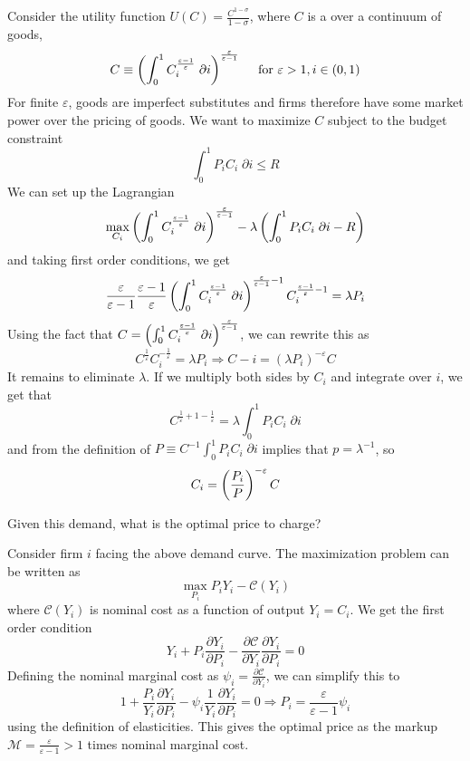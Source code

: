\documentclass[10pt]{article}
\begin{document}
\begin{model}
	 Consider the utility function $U(C) = \frac{C^{1-\sigma}}{1-\sigma}$, where $C$ is a  over a continuum of goods,\[C \equiv \left( \int_0^1 C_i^{\frac{\varepsilon-1}{\varepsilon}}\; \partial i \right)^{\frac{\varepsilon}{\varepsilon-1}} \quad \text{ for } \varepsilon > 1, i \in (0,1)\]For finite $\varepsilon$, goods are imperfect substitutes and firms therefore have some market power over the pricing of goods. We want to maximize $C$ subject to the budget constraint\[\int_0^1 P_i C_i\; \partial i \le R\]We can set up the Lagrangian\[ \max_{C_i} \left( \int_0^1 C_i^{\frac{\varepsilon-1}{\varepsilon}}\;\partial i\right)^{\frac{\varepsilon}{\varepsilon-1}} - \lambda \left( \int_0^1 P_iC_i \;\partial i - R\right)\]and taking first order conditions, we get\[\frac{\varepsilon}{\varepsilon-1} \frac{\varepsilon-1}{\varepsilon} \left( \int_0^1 C_i^{\frac{\varepsilon-1}{\varepsilon}}\;\partial i\right)^{\frac{\varepsilon}{\varepsilon-1}-1} C_i^{\frac{\varepsilon-1}{\varepsilon}-1} = \lambda P_i\]Using the fact that $C = \left( \int_0^1 C_i^{\frac{\varepsilon-1}{\varepsilon}}\; \partial i \right)^{\frac{\varepsilon}{\varepsilon-1}}$, we can rewrite this as\[C^\frac{1}{\varepsilon} C_i^{-\frac{1}{\varepsilon}} = \lambda P_i \Longrightarrow C-i = (\lambda P_i)^{-\varepsilon} C\]It remains to eliminate $\lambda$. If we multiply both sides by $C_i$ and integrate over $i$, we get that \[C^{\frac{1}{\varepsilon} + 1 - \frac{1}{\varepsilon}} = \lambda \int_0^1 P_iC_i\;\partial i\]and from the definition of $P \equiv C^{-1} \int_0^1 P_iC_i\;\partial i$ implies that $p = \lambda^{-1}$, so\[C_i = \left( \frac{P_i}{P}\right)^{-\varepsilon}C\]


\begin{question}
	Given this demand, what is the optimal price to charge?
\end{question}
\begin{remark}
	Consider firm $i$ facing the above demand curve. The maximization problem can be written as \[\max_{P_i} P_i Y_i - \mathcal{C}(Y_i)\]where $\mathcal{C}(Y_i)$ is nominal cost as a function of output $Y_i = C_i$. We get the first order condition \[Y_i + P_i \frac{\partial Y_i}{\partial P_i} - \frac{\partial \mathcal{C}}{\partial Y_i} \frac{\partial Y_i}{\partial P_i} = 0\]Defining the nominal marginal cost as $\psi_i = \frac{\partial \mathcal{C}}{\partial Y_i}$, we can simplify this to \[1 + \frac{P_i}{Y_i} \frac{\partial Y_i}{\partial P_i} - \psi_i \frac{1}{Y_i} \frac{\partial Y_i}{\partial P_i} = 0 \Longrightarrow P_i = \frac{\varepsilon}{\varepsilon-1} \psi_i\]using the definition of elasticities. This gives the optimal price as the markup $\mathcal{M} = \frac{\varepsilon}{\varepsilon-1} > 1$ times nominal marginal cost.
\end{remark}
\end{model}
\end{document}
